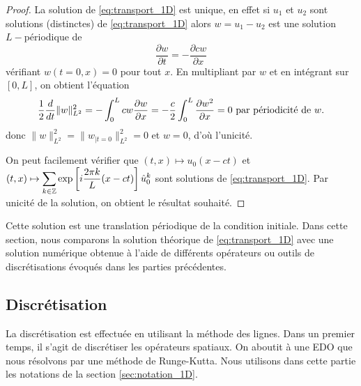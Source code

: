 \begin{proof}
La solution de \eqref{eq:transport_1D} est unique, en effet si $u_1$ et $u_2$ sont solutions (distinctes) de \eqref{eq:transport_1D} alors $w = u_1-u_2$ est une solution $L-$périodique de 
\begin{equation}
\dfrac{\partial w}{\partial t} = - \dfrac{\partial  cw}{\partial x}
\end{equation}
vérifiant $w(t=0,x)=0$ pour tout $x$. En multipliant par $w$ et en intégrant sur $[0,L]$, on obtient l'équation
\begin{equation*}
\dfrac{1}{2} \dfrac{d}{dt} \| w \|_{L^2}^2 = - \displaystyle\int_{0}^L cw \dfrac{\partial w}{\partial x} = - \dfrac{c}{2} \displaystyle\int_{0}^L \dfrac{\partial w^2}{\partial x} = 0 \text{ par périodicité de }w.
\end{equation*}
donc $\| w \|_{L^2}^2=\| w_{|t=0} \|_{L^2}^2 = 0$ et $w=0$, d'où l'unicité.

On peut facilement vérifier que $(t,x) \mapsto u_0(x-ct)$ et $(t,x) \mapsto \displaystyle\sum\limits_{k \in \mathbb{Z}} \exp \left[ i \dfrac{2 \pi k}{L} (x-ct) \right] \hat{u}_0^k$ sont solutions de \eqref{eq:transport_1D}. Par unicité de la solution, on obtient le résultat souhaité.
\end{proof}
Cette solution est une translation périodique de la condition initiale. Dans cette section, nous comparons la solution théorique de \eqref{eq:transport_1D} avec une solution numérique obtenue à l'aide de différents opérateurs ou outils de discrétisations évoqués dans les parties précédentes.









\subsection{Discrétisation}

La discrétisation est effectuée en utilisant la méthode des lignes. Dans un premier temps, il s'agit de discrétiser les opérateurs spatiaux. On aboutit à une EDO que nous résolvons par une méthode de Runge-Kutta. Nous utilisons dans cette partie les notations de la section \ref{sec:notation_1D}.
 
